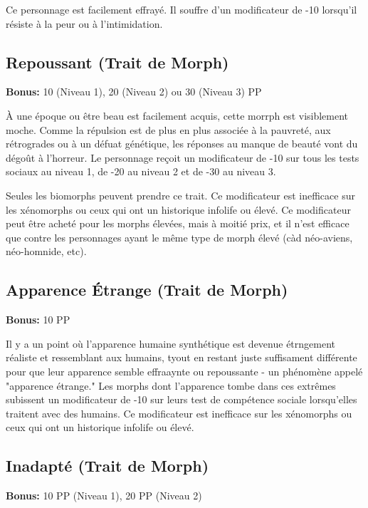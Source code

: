 Ce personnage est facilement effrayé. Il souffre d'un modificateur de -10 lorsqu'il résiste à la peur ou à l'intimidation. 

\subsection{Repoussant (Trait de Morph)} \label{sec:traits-unattractive} 

\textbf{Bonus:} 10 (Niveau 1), 20 (Niveau 2) ou 30 (Niveau 3) PP 

À une époque ou être beau est facilement acquis, cette morrph est visiblement moche. Comme la répulsion est de plus en plus associée à la pauvreté, aux rétrogrades ou à un défuat génétique, les réponses au manque de beauté vont du dégoût à l'horreur. Le personnage reçoit un modificateur de -10 sur tous les tests sociaux au niveau 1, de -20 au niveau 2 et de -30 au niveau 3. 

Seules les biomorphs peuvent prendre ce trait. Ce modificateur est inefficace sur les xénomorphs ou ceux qui ont un historique infolife ou élevé. Ce modificateur peut être acheté pour les morphs élevées, mais à moitié prix, et il n'est efficace que contre les personnages ayant le même type de morph élevé (càd néo-aviens, néo-homnide, etc). 

\subsection{Apparence Étrange (Trait de Morph)} \label{sec:traits-uncanny-valley} 

\textbf{Bonus:} 10 PP 

Il y a un point où l'apparence humaine synthétique est devenue étrngement réaliste et ressemblant aux humains, tyout en restant juste suffisament différente pour que leur apparence semble effraaynte ou repoussante - un phénomène appelé "apparence étrange." Les morphs dont l'apparence tombe dans ces extrêmes subissent un modificateur de -10 sur leurs test de compétence sociale lorsqu'elles traitent avec des humains. Ce modificateur est inefficace sur les xénomorphs ou ceux qui ont un historique infolife ou élevé. 

\subsection{Inadapté (Trait de Morph)} \label{sec:traits-unfit} 

\textbf{Bonus:} 10 PP (Niveau 1), 20 PP (Niveau 2) 

